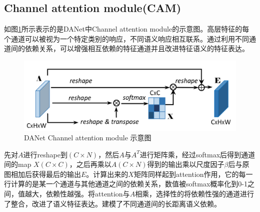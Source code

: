 \documentclass[cn]{elegantbook}
\begin{document}
\subsection{Channel attention module(CAM)}
如图\ref{cam}所示表示的是DANet中Channel attention module的示意图。高层特征的每个通道可以被视为一个特定类别的响应，不同语义响应相互联系。通过利用不同通道间的依赖关系，可以增强相互依赖的特征通道并且改进特征语义的特征表达。
\begin{figure}[!h]
	\centering
	\includegraphics[width=\textwidth]{images/cam}
	\caption{\label{cam}DANet Channel attention module 示意图}
\end{figure}
先对$A$进行reshape到$(C\times N)$，然后$A$与$A^T$进行矩阵乘，经过softmax后得到通道间的map $X(C\times C)$，之后再乘以$A(C\times N)$得到的输出乘以尺度因子$\beta$后与原图相加后获得最后的输出$E$。计算出来的$X$矩阵同样起到attention作用，它的每一行计算的是某一个通道与其他通道之间的依赖关系，数值被softmax概率化到0-1之间，值越大，依赖性越强。将attention与$A$相乘，选择性的将依赖性强的通道进行了整合，改进了语义特征表达。建模了不同通道间的长距离语义依赖。
\end{document}
